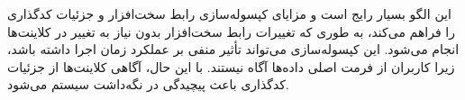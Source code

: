 \begin{RTL}
این الگو بسیار رایج است و مزایای کپسوله‌سازی رابط سخت‌افزار و جزئیات
کدگذاری را فراهم می‌کند، به طوری که تغییرات رابط سخت‌افزار بدون نیاز به
تغییر در کلاینت‌ها انجام می‌شود. این کپسوله‌سازی می‌تواند تأثیر منفی
بر عملکرد زمان اجرا داشته باشد، زیرا کاربران از فرمت اصلی داده‌ها آگاه
نیستند. با این حال، آگاهی کلاینت‌ها از جزئیات کدگذاری باعث پیچیدگی
در نگه‌داشت سیستم می‌شود.
\end{RTL}